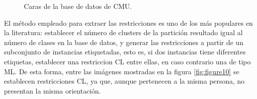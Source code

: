 \clearpage

\begin{figure}[bth]
	\myfloatalign
	 \quad
	 \quad
	 \quad
	\caption{Caras de la base de datos de  \ac{CMU}. \cite{Survey:2007}}\label{fig:figure9}
\end{figure}

El método empleado para extraer las restricciones es uno de los más populares en la literatura: establecer el número de clusters de la partición resultado igual al número de clases en la base de datos, y generar las restricciones a partir de un subconjunto de instancias etiquetadas, esto es, si dos instancias tiene diferentes etiquetas, establecer una restriccion \acf{CL} entre ellas, en caso contrario una de tipo \acf{ML}. De esta forma, entre las imágenes mostradas en la figura \ref{fig:figure10} se establecen restricciones \acf{CL}, ya que, aunque pertenecen a la misma persona, no presentan la misma orientación.

